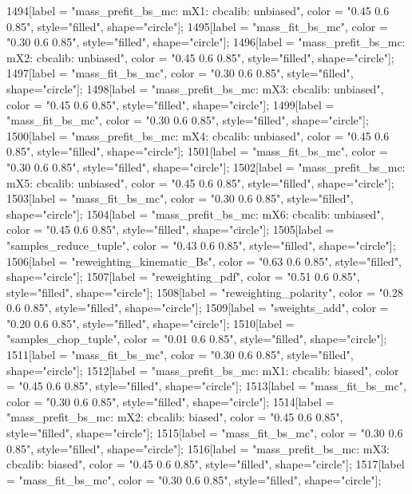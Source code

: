 {	1494[label = "mass_prefit_bs_mc\nmassbin: mX1\nmassmodel: cbcalib\ntrigger: unbiased", color = "0.45 0.6 0.85", style="filled", shape="circle"];
	1495[label = "mass_fit_bs_mc", color = "0.30 0.6 0.85", style="filled", shape="circle"];
	1496[label = "mass_prefit_bs_mc\nmassbin: mX2\nmassmodel: cbcalib\ntrigger: unbiased", color = "0.45 0.6 0.85", style="filled", shape="circle"];
	1497[label = "mass_fit_bs_mc", color = "0.30 0.6 0.85", style="filled", shape="circle"];
	1498[label = "mass_prefit_bs_mc\nmassbin: mX3\nmassmodel: cbcalib\ntrigger: unbiased", color = "0.45 0.6 0.85", style="filled", shape="circle"];
	1499[label = "mass_fit_bs_mc", color = "0.30 0.6 0.85", style="filled", shape="circle"];
	1500[label = "mass_prefit_bs_mc\nmassbin: mX4\nmassmodel: cbcalib\ntrigger: unbiased", color = "0.45 0.6 0.85", style="filled", shape="circle"];
	1501[label = "mass_fit_bs_mc", color = "0.30 0.6 0.85", style="filled", shape="circle"];
	1502[label = "mass_prefit_bs_mc\nmassbin: mX5\nmassmodel: cbcalib\ntrigger: unbiased", color = "0.45 0.6 0.85", style="filled", shape="circle"];
	1503[label = "mass_fit_bs_mc", color = "0.30 0.6 0.85", style="filled", shape="circle"];
	1504[label = "mass_prefit_bs_mc\nmassbin: mX6\nmassmodel: cbcalib\ntrigger: unbiased", color = "0.45 0.6 0.85", style="filled", shape="circle"];
	1505[label = "samples_reduce_tuple", color = "0.43 0.6 0.85", style="filled", shape="circle"];
	1506[label = "reweighting_kinematic_Bs", color = "0.63 0.6 0.85", style="filled", shape="circle"];
	1507[label = "reweighting_pdf", color = "0.51 0.6 0.85", style="filled", shape="circle"];
	1508[label = "reweighting_polarity", color = "0.28 0.6 0.85", style="filled", shape="circle"];
	1509[label = "sweights_add", color = "0.20 0.6 0.85", style="filled", shape="circle"];
	1510[label = "samples_chop_tuple", color = "0.01 0.6 0.85", style="filled", shape="circle"];
	1511[label = "mass_fit_bs_mc", color = "0.30 0.6 0.85", style="filled", shape="circle"];
	1512[label = "mass_prefit_bs_mc\nmassbin: mX1\nmassmodel: cbcalib\ntrigger: biased", color = "0.45 0.6 0.85", style="filled", shape="circle"];
	1513[label = "mass_fit_bs_mc", color = "0.30 0.6 0.85", style="filled", shape="circle"];
	1514[label = "mass_prefit_bs_mc\nmassbin: mX2\nmassmodel: cbcalib\ntrigger: biased", color = "0.45 0.6 0.85", style="filled", shape="circle"];
	1515[label = "mass_fit_bs_mc", color = "0.30 0.6 0.85", style="filled", shape="circle"];
	1516[label = "mass_prefit_bs_mc\nmassbin: mX3\nmassmodel: cbcalib\ntrigger: biased", color = "0.45 0.6 0.85", style="filled", shape="circle"];
	1517[label = "mass_fit_bs_mc", color = "0.30 0.6 0.85", style="filled", shape="circle"];
}
